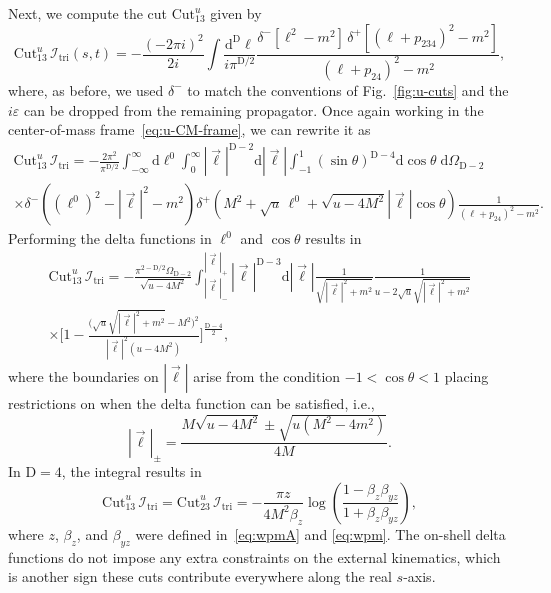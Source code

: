 \documentclass[12pt]{article}
\numberwithin{figure}{section}
\def \be {\begin{equation}}
\def \ee {\end{equation}}
\def \D {\mathrm{D}}
\def \d {\mathrm{d}}
\def \eps {\varepsilon}
\def \I {\mathcal{I}}
\def \triangle {\mathrm{tri}}
\def \Cut {\mathrm{Cut}}
\begin{document}
    
    Next, we compute the cut $\Cut_{13}^u$ given by
    \begin{equation}
    \Cut_{13}^u\, \I_\triangle(s,t) = -\frac{\left(-2\pi i \right)^2}{2i}  \int \frac{\d^\D \ell}{i \pi^{\D/2}}   \frac{\delta^-[\ell^2-m^2]\, \delta^+[(\ell+p_{234})^2-m^2]}{(\ell + p_{24})^2-m^2},
    \end{equation}
    where, as before, we used $\delta^-$ to match the conventions of Fig.~\ref{fig:u-cuts} and the $i\eps$ can be dropped from the remaining propagator.
    Once again working in the center-of-mass frame~\eqref{eq:u-CM-frame}, we can rewrite it as
    \begin{multline}
    \Cut_{13}^u\, \I_\triangle = - \frac{2 \pi^2}{\pi^{\D/2}}
        \int_{-\infty}^{\infty} \d \ell^0 \int_0^\infty |\vec{\ell}|^{\D-2} \d |\vec{\ell}| \int_{-1}^1 \left(\sin \theta\right)^{\D-4} \d \cos \theta \; \d \Omega_{\D-2}
        \\
        \times \delta^- \left((\ell^0)^2-|\vec{\ell}|^2-m^2\right) 
        \delta^+ \left(M^2+\sqrt{u} \, \ell^0 + \sqrt{u-4 M^2} |\vec{\ell}| \cos \theta\right) \frac{1}{(\ell+p_{24})^2-m^2}.
    \end{multline}
    Performing the delta functions in $\ell^0$ and $\cos \theta$ results in
    \begin{multline}
    \Cut_{13}^u\, \I_\triangle = -  \frac{\pi^{2-\D/2}\Omega_{\D-2}}{\sqrt{u-4 M^2}} \int_{|\vec{\ell}|_-}^{|\vec{\ell}|_+} |\vec{\ell}|^{\D-3} \d |\vec{\ell}|
        \frac{1}{\sqrt{|\vec{\ell}|^2+m^2}}
        \frac{1}{u-2\sqrt{u}\sqrt{|\vec{\ell}|^2+m^2}}
        \\
        \times 
        \Bigg[1- \frac{\big(\sqrt{u}\sqrt{|\vec{\ell}|^2+m^2 }-M^2\big)^2}{|\vec{\ell}|^2(u-4M^2)}\Bigg]^{\frac{\D-4}{2}} ,
    \end{multline}
    where the boundaries on $|\vec{\ell}|$ arise from the condition  $-1<\cos \theta < 1$ placing restrictions on when the delta function can be satisfied, i.e.,
    \be
    |\vec{\ell}|_{\pm} = \frac{M \sqrt{u-4 M^2}\pm\sqrt{u (M^2-4 m^2)}}{4 M}.
    \ee
    In $\D=4$, the integral results in
    \begin{equation}
    \Cut_{13}^u\, \I_\triangle = \Cut_{23}^u\, \I_\triangle = - \frac{\pi z}{4 M^2 \beta_z}
        \log \left( 
        \frac{1-\beta_z \beta_{yz}}{1+\beta_z \beta_{yz}}
        \right),
    \end{equation}
    where $z$, $\beta_z$, and $\beta_{yz}$ were defined in~\eqref{eq:wpmA} and \eqref{eq:wpm}. The on-shell delta functions do not impose any extra constraints on the external kinematics, which is another sign these cuts contribute everywhere along the real $s$-axis.
    
\end{document}
